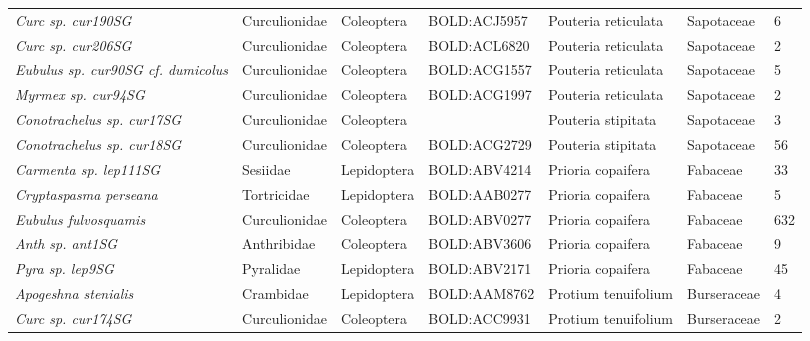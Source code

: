 \documentclass[11pt]{article}
\begin{document}
\begin{landscape}
\begin{longtable}{@{}lllllll@{}}
\textit{Curc sp. cur190SG}                            & Curculionidae   & Coleoptera   & BOLD:ACJ5957 & Pouteria reticulata                & Sapotaceae       & 6     \\
\textit{Curc sp. cur206SG}                            & Curculionidae   & Coleoptera   & BOLD:ACL6820 & Pouteria reticulata                & Sapotaceae       & 2     \\
\textit{Eubulus sp. cur90SG cf. dumicolus}            & Curculionidae   & Coleoptera   & BOLD:ACG1557 & Pouteria reticulata                & Sapotaceae       & 5     \\
\textit{Myrmex sp. cur94SG}                           & Curculionidae   & Coleoptera   & BOLD:ACG1997 & Pouteria reticulata                & Sapotaceae       & 2     \\
\textit{Conotrachelus sp. cur17SG}                    & Curculionidae   & Coleoptera   &              & Pouteria stipitata                 & Sapotaceae       & 3     \\
\textit{Conotrachelus sp. cur18SG}                    & Curculionidae   & Coleoptera   & BOLD:ACG2729 & Pouteria stipitata                 & Sapotaceae       & 56    \\
\textit{Carmenta sp. lep111SG}                        & Sesiidae        & Lepidoptera  & BOLD:ABV4214 & Prioria copaifera                  & Fabaceae         & 33    \\
\textit{Cryptaspasma perseana}                        & Tortricidae     & Lepidoptera  & BOLD:AAB0277 & Prioria copaifera                  & Fabaceae         & 5     \\
\textit{Eubulus fulvosquamis}                         & Curculionidae   & Coleoptera   & BOLD:ABV0277 & Prioria copaifera                  & Fabaceae         & 632   \\
\textit{Anth sp. ant1SG}                              & Anthribidae     & Coleoptera   & BOLD:ABV3606 & Prioria copaifera                  & Fabaceae         & 9     \\
\textit{Pyra sp. lep9SG}                              & Pyralidae       & Lepidoptera  & BOLD:ABV2171 & Prioria copaifera                  & Fabaceae         & 45    \\
\textit{Apogeshna stenialis}                          & Crambidae       & Lepidoptera  & BOLD:AAM8762 & Protium tenuifolium                & Burseraceae      & 4     \\
\textit{Curc sp. cur174SG}                            & Curculionidae   & Coleoptera   & BOLD:ACC9931 & Protium tenuifolium                & Burseraceae      & 2     \\

\end{longtable}
\end{landscape}
\end{document}
